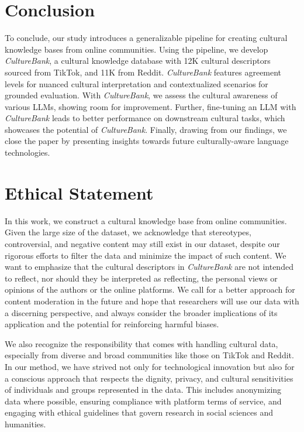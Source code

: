 \documentclass{article} %
\newcommand{\dataname}{\textit{CultureBank}\xspace}
\begin{document}
\section{Conclusion}
To conclude, our study introduces a generalizable pipeline for creating cultural knowledge bases from online communities. Using the pipeline, we develop \dataname, a cultural knowledge database with 12K cultural descriptors sourced from TikTok, and 11K from  Reddit. \dataname features agreement levels for nuanced cultural interpretation and contextualized scenarios for grounded evaluation. %
With \dataname, we assess the cultural awareness of various LLMs, showing room for improvement. Further, fine-tuning an LLM with \dataname leads to better performance on downstream cultural tasks, which showcases  the potential of \dataname. Finally, drawing from our findings, we close the paper by presenting insights towards future culturally-aware language technologies.
\section*{Ethical Statement}
In this work, we construct a cultural knowledge base from online communities. %
Given the large size of the dataset, we acknowledge that stereotypes, controversial, and negative content may still exist in our dataset, despite our rigorous efforts to filter the data and minimize the impact of such content. We want to emphasize that the cultural descriptors in \dataname are not intended to reflect, nor should they be interpreted as reflecting, the personal views or opinions of the authors or the online platforms.
 We call for a better approach for content moderation in the future and hope that researchers will use our data with a discerning perspective, and always consider the broader implications of its application and the potential for reinforcing harmful biases. %

We also recognize the responsibility that comes with handling cultural data, especially from diverse and broad communities like those on TikTok and Reddit. In our method, we have strived not only for technological innovation but also for a conscious approach that respects the dignity, privacy, and cultural sensitivities of individuals and groups represented in the data. This includes anonymizing data where possible, ensuring compliance with platform terms of service, and engaging with ethical guidelines that govern research in social sciences and humanities.
\end{document}
